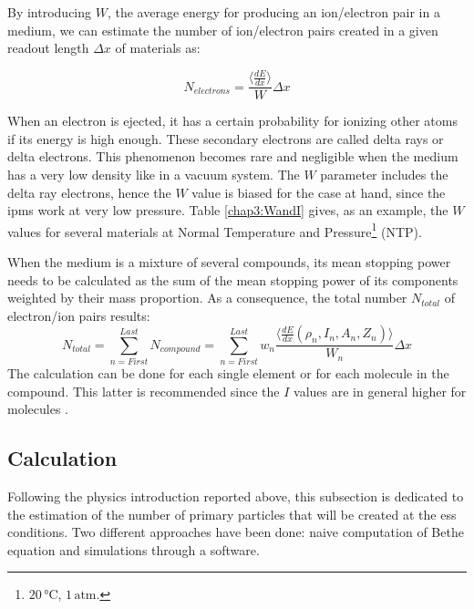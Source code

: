 \begin{refsection}
  By introducing \(W\), the average energy for producing an ion/electron pair in a medium, we can estimate the number of ion/electron pairs created in a given readout length $\Delta x$ of materials \cite{Weiss1955,Bichsel1979} as:

  \begin{equation}
    N_{electrons}= \frac{\big \langle \frac{dE}{dx} \big \rangle}{W} \Delta x
  \end{equation}

  When an electron is ejected, it has a certain probability for ionizing other atoms if its energy is high enough. These secondary electrons are called delta rays or delta electrons. This phenomenon becomes rare and negligible when the medium has a very low density like in a vacuum system. The \(W\) parameter includes the delta ray electrons, hence the \(W\) value is biased \cite[p. 470]{Tanabashi2018} for the case at hand, since the \acrshort{ipm}s work at very low pressure. Table \ref{chap3:WandI} gives, as an example, the \(W\) values for several materials at Normal Temperature and Pressure\footnote{$20\,\mathrm{°C}$, $1\,\mathrm{atm}$.} (NTP).

  

  When the medium is a mixture of several compounds, its mean stopping power needs to be calculated as the sum of the mean stopping power of its components weighted by their mass proportion. As a consequence, the total number $N_{total}$ of electron/ion pairs results:
  \begin{equation}
    N_{total}= \sum_{n= First}^{Last} N_{compound}= \sum_{n= First}^{Last} w_{n} \frac{\big \langle \frac{dE}{dx}\left(\rho_{n},I_{n},A_{n},Z_{n}\right) \big \rangle}{W_{n}} \Delta x
  \end{equation}
  The calculation can be done for each single element or for each molecule in the compound.
  This latter is recommended since the \(I\) values are in general higher for molecules \cite[p. 451]{Tanabashi2018}.

  \subsection{Calculation}
  \label{chap3:calc}
  Following the physics introduction reported above, this subsection is dedicated to the estimation of the number of primary particles that will be created at the \acrshort{ess} conditions. Two different approaches have been done: naive computation of Bethe equation and simulations through a software.


\end{refsection}
